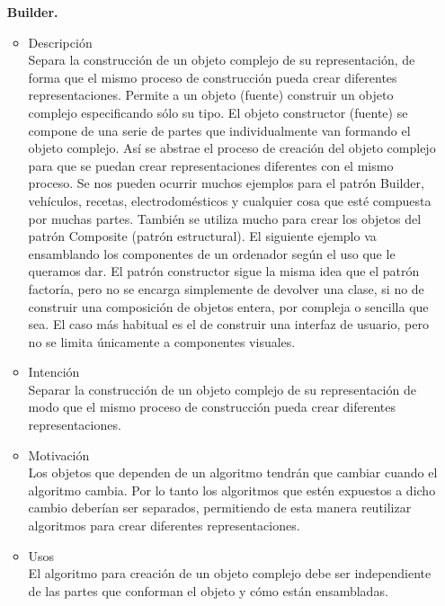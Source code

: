\documentclass{article}
\begin{document}
\begin{enumerate}
\begin{itemize}
\item[\bf{Builder.}]

\begin{itemize}
\item{Descripción}\\

Separa la construcción de un objeto complejo de su representación, de forma que el mismo proceso de construcción pueda crear diferentes representaciones.
Permite a un objeto (fuente) construir un objeto complejo especificando sólo su tipo. El objeto constructor (fuente) se compone de una serie de partes que individualmente van formando el objeto complejo. Así se abstrae el proceso de creación del objeto complejo para que se puedan crear representaciones diferentes con el mismo proceso. 
Se nos pueden ocurrir muchos ejemplos para el patrón Builder, vehículos, recetas, electrodomésticos y cualquier cosa que esté compuesta por muchas partes. También se utiliza mucho para crear los objetos del patrón Composite (patrón estructural). El siguiente ejemplo va ensamblando los componentes de un ordenador según el uso que le queramos dar. 
El patrón constructor sigue la misma idea que el patrón factoría, pero no se encarga simplemente de devolver una clase, si no de construir una composición de objetos entera, por compleja o sencilla que sea. El caso más habitual es el de construir una interfaz de usuario, pero no se limita únicamente a componentes visuales.

\item{Intención}\\

Separar la construcción de un objeto complejo de su representación de modo que el mismo proceso de construcción pueda crear diferentes representaciones.

\item{Motivación}\\

Los objetos que dependen de un algoritmo tendrán que cambiar cuando el algoritmo cambia. Por lo tanto los algoritmos que estén expuestos a dicho cambio deberían ser separados, permitiendo de esta manera reutilizar algoritmos para crear diferentes representaciones.

\item{Usos}\\

El algoritmo para creación de un objeto complejo debe ser independiente de las partes que conforman el objeto y cómo están ensambladas.\\


\end{itemize}
\end{itemize}
\end{enumerate}
\end{document}
